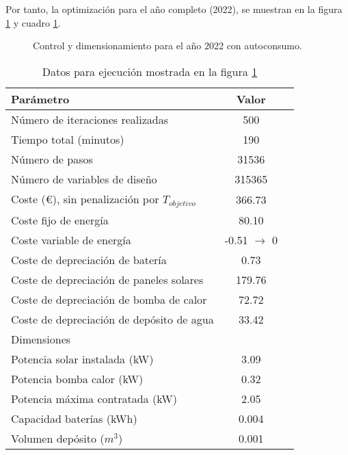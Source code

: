 Por tanto, la optimización para el año completo (2022), se muestran en la
figura \ref{fig:sizing_regulated_full_year} y cuadro \ref{tab:sizing_regulated_full_year}.

\begin{figure}[h] \centering
	\centering
	
	\caption{Control y dimensionamiento para el año 2022 con autoconsumo.}
	\label{fig:sizing_regulated_full_year}
\end{figure}

\begin{table}[ht]
	\centering
	\caption{Datos para ejecución mostrada en la figura \ref{fig:sizing_regulated_full_year}}
	\label{tab:sizing_regulated_full_year}
	\begin{tabular}{@{}lcc@{}}
		\toprule
		Parámetro                                      & Valor                 \\
		\midrule
		Número de iteraciones realizadas               & 500                   \\
		Tiempo total (minutos)                         & 190                   \\
		Número de pasos                                & 31536                 \\
		Número de variables de diseño                  & 315365                \\
		\midrule
		Coste (€), sin penalización por $T_{objetivo}$ & 366.73                \\
		\midrule
		Coste fijo de energía                          & 80.10                 \\
		Coste variable de energía                      & -0.51 $\rightarrow$ 0 \\
		Coste de depreciación de batería               & 0.73                  \\
		Coste de depreciación de paneles solares       & 179.76                \\
		Coste de depreciación de bomba de calor        & 72.72                 \\
		Coste de depreciación de depósito de agua      & 33.42                 \\
		\midrule
		Dimensiones                                    &                       \\
		\midrule
		Potencia solar instalada (kW)                  & 3.09                  \\
		Potencia bomba calor (kW)                      & 0.32                  \\
		Potencia máxima contratada (kW)                & 2.05                  \\
		Capacidad baterías (kWh)                       & 0.004                 \\
		Volumen depósito ($m^3$)                       & 0.001                 \\
		\bottomrule
	\end{tabular}
\end{table}


